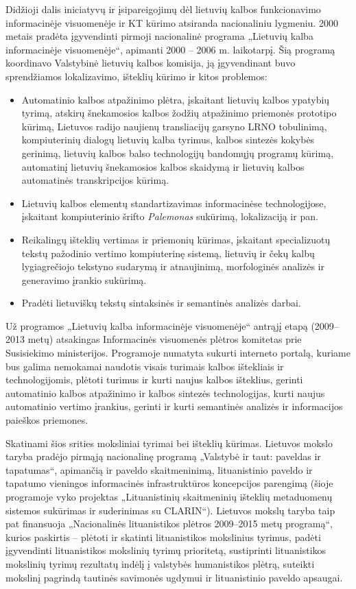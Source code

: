 \documentclass[]{../metanetpaper}
\begin{document}
\begin{multicols}{2}
Didžioji dalis iniciatyvų ir įsipareigojimų dėl lietuvių kalbos funkcionavimo informacinėje visuomenėje ir KT kūrimo atsiranda nacionaliniu lygmeniu. 2000 metais pradėta įgyvendinti pirmoji nacionalinė programa „Lietuvių kalba informacinėje visuomenėje“, apimanti 2000 – 2006 m. laikotarpį. Šią programą koordinavo Valstybinė lietuvių kalbos komisija, ją įgyvendinant buvo sprendžiamos lokalizavimo, išteklių kūrimo ir kitos problemos:
\begin{itemize}
      \item Automatinio kalbos atpažinimo plėtra, įskaitant lietuvių kalbos ypatybių tyrimą, atskirų šnekamosios kalbos žodžių atpažinimo priemonės prototipo kūrimą, Lietuvos radijo naujienų transliacijų garsyno LRNO tobulinimą, kompiuterinių dialogų lietuvių kalba tyrimus, kalbos sintezės kokybės gerinimą, lietuvių kalbos balso technologijų bandomųjų programų kūrimą, automatinį lietuvių šnekamosios kalbos skaidymą ir lietuvių kalbos automatinės transkripcijos kūrimą.
      \item Lietuvių kalbos elementų standartizavimas informacinėse technologijose, įskaitant kompiuterinio šrifto \textit{Palemonas} sukūrimą, lokalizaciją ir pan.
      \item Reikalingų išteklių vertimas ir priemonių kūrimas, įskaitant specializuotų tekstų pažodinio vertimo kompiuterinę sistemą, lietuvių ir čekų kalbų lygiagrečiojo tekstyno sudarymą ir atnaujinimą, morfologinės analizės ir generavimo įrankio sukūrimą.
      \item Pradėti lietuviškų tekstų sintaksinės ir semantinės analizės darbai. 
          \end{itemize}

    Už programos „Lietuvių kalba informacinėje visuomenėje“ antrąjį etapą (2009–2013 metų) atsakingas Informacinės visuomenės plėtros komitetas prie Susisiekimo ministerijos. Programoje numatyta sukurti interneto portalą, kuriame bus galima nemokamai naudotis visais turimais kalbos ištekliais ir technologijomis, plėtoti turimus ir kurti naujus kalbos išteklius, gerinti automatinio kalbos atpažinimo ir kalbos sintezės technologijas, kurti naujus automatinio vertimo įrankius, gerinti ir kurti semantinės analizės ir informacijos paieškos priemones.

Skatinami šios srities moksliniai tyrimai bei išteklių kūrimas. Lietuvos mokslo taryba pradėjo pirmąją nacionalinę programą „Valstybė ir taut: paveldas ir tapatumas“, apimančią ir paveldo skaitmeninimą, lituanistinio paveldo ir tapatumo vieningos informacinės infrastruktūros koncepcijos parengimą (šioje programoje vyko projektas „Lituanistinių skaitmeninių išteklių metaduomenų sistemos sukūrimas ir suderinimas su CLARIN“). Lietuvos mokslų taryba taip pat finansuoja „Nacionalinės lituanistikos plėtros 2009–2015 metų programą“, kurios paskirtis – plėtoti ir skatinti lituanistikos mokslinius tyrimus, padėti įgyvendinti lituanistikos mokslinių tyrimų prioritetą, sustiprinti lituanistikos mokslinių tyrimų rezultatų indėlį į valstybės humanistikos plėtrą, suteikti mokslinį pagrindą tautinės savimonės ugdymui ir lituanistinio paveldo apsaugai. 


\end{multicols}
\end{document}
